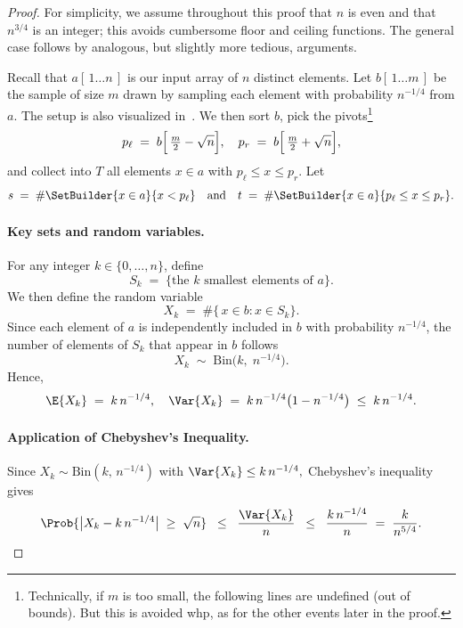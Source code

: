     \begin{proof}
    For simplicity, we assume throughout this proof that \(n\) is even and that \(n^{3/4}\) is an integer; this avoids cumbersome floor and ceiling functions. The general case follows by analogous, but slightly more tedious, arguments.
    
    Recall that \(a[\,1\dots n\,]\) is our input array of \(n\) distinct elements. Let \(b[\,1\dots m\,]\) be the sample of size \(m\) drawn by sampling each element with probability $n^{-1/4}$ from \(a\). The setup is also visualized in~. We then sort \(b\), pick the pivots\footnote{Technically, if $m$ is too small, the following lines are undefined (out of bounds). But this is avoided whp, as for the other events later in the proof.}
    \[
    p_\ell \;=\; b\Bigl[\,\tfrac{m}{2} - \sqrt{n}\Bigr],
    \quad
    p_r \;=\; b\Bigl[\,\tfrac{m}{2} + \sqrt{n}\Bigr],
    \]
    and collect into \(T\) all elements \(x \in a\) with \(p_\ell \le x \le p_r\). Let
    \[
    s \;=\; \#\SetBuilder{x\in a}{x < p_\ell}
    \quad\text{and}\quad
    t \;=\; \#\SetBuilder{x\in a}{p_\ell \le x \le p_r}.
    \]
    \paragraph{Key sets and random variables.}
For any integer \(k \in \{0,\dots,n\}\), define
\[
   S_k \;=\; \{\text{the }k \text{ smallest elements of } a\}.
\]
We then define the random variable
\[
   X_k \;=\; \#\{\, x \in b : x \in S_k \}.
\]
Since each element of \(a\) is independently included in \(b\) with probability \(n^{-1/4}\),
the number of elements of \(S_k\) that appear in \(b\) follows
\[
   X_k \;\sim\; \mathrm{Bin}\bigl(k,\;n^{-1/4}\bigr).
\]
Hence,
\[
   \E{X_k} \;=\; k\,n^{-1/4},
   \quad
   \Var{X_k} \;=\; k\,n^{-1/4}\bigl(1 - n^{-1/4}\bigr)
   \;\le\;
   k\,n^{-1/4}.
\]

    
    \paragraph{Application of Chebyshev’s Inequality.}
    Since \(X_k \sim \mathrm{Bin}(k,\,n^{-1/4})\) with 
\(\Var{X_k} \le k\,n^{-1/4},\)
Chebyshev’s inequality gives
\begin{equation}
    \Prob{\bigl|X_k - k\,n^{-1/4}\bigr|\;\ge\;\sqrt{n}}
    \;\;\le\;\;
    \frac{\Var{X_k}}{\,n\,}
    \;\;\le\;\;
    \frac{k\,n^{-1/4}}{n}
    \;=\;
    \frac{k}{n^{5/4}}. \label{eq:fail}   
\end{equation}

\end{proof}
